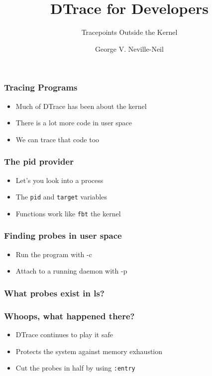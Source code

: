 \documentclass[pdftex]{beamer}
\begin{document}

\title{DTrace for Developers}
\subtitle{Tracepoints Outside the Kernel}
\author[shortname]{George V. Neville-Neil}

\begin{frame}
  \titlepage
\end{frame}

\begin{frame}
  \frametitle{Tracing Programs}
  \begin{itemize}
  \item Much of DTrace has been about the kernel
  \item There is a lot more code in user space
  \item We can trace that code too
  \end{itemize}
\end{frame}

\begin{frame}[fragile]
  \frametitle{The pid provider}
  \begin{itemize}
  \item Let's you look into a process
  \item The \verb+pid+ and \verb+target+ variables
  \item Functions work like \verb+fbt+ the kernel
  \end{itemize}
\end{frame}

\begin{frame}
  \frametitle{Finding probes in user space}
  \begin{itemize}
  \item Run the program with -c
  \item Attach to a running daemon with -p
  \end{itemize}
\end{frame}

\begin{frame}
  \frametitle{What probes exist in ls?}
  
\end{frame}

\begin{frame}[fragile]
  \frametitle{Whoops, what happened there?}
  \begin{itemize}
  \item DTrace continues to play it safe
  \item Protects the system against memory exhaustion
  \item Cut the probes in half by using \verb+:entry+
  \end{itemize}
\end{frame}
\end{document}
